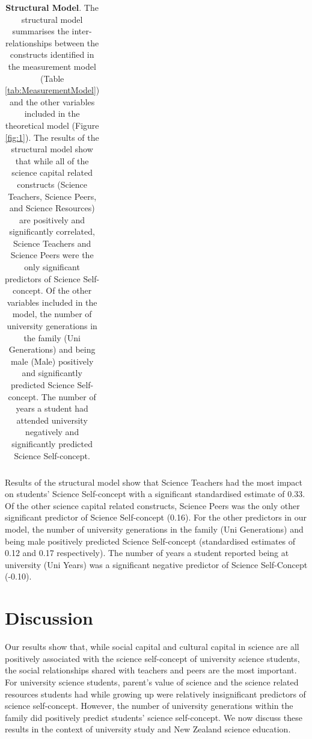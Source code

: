 \begin{landscape}
\begin{table}[ht]
\begin{tabular}{llrrrrr}
   \hline
\end{tabular}
\caption{\textbf{Structural Model}. The structural model summarises the inter-relationships between the constructs identified in the measurement model (Table \ref{tab:MeasurementModel}) and the other variables included in the theoretical model (Figure  \ref{fig:1}). The results of the structural model show that while all of the science capital related constructs (Science Teachers, Science Peers, and Science Resources) are positively and significantly correlated, Science Teachers and Science Peers were the only significant predictors of Science Self-concept. Of the other variables included in the model, the number of university generations in the family (Uni Generations) and being male (Male) positively and significantly predicted Science Self-concept. The number of years a student had attended university negatively and significantly predicted Science Self-concept.} 
\label{tab:StructuralModel}
\end{table}
\end{landscape}

Results of the structural model show that Science Teachers had the most impact on students' Science Self-concept with a significant standardised estimate of 0.33. Of the other science capital related constructs, Science Peers was the only other significant predictor of Science Self-concept (0.16). For the other predictors in our model, the number of university generations in the family (Uni Generations) and being male positively predicted Science Self-concept (standardised estimates of 0.12 and 0.17 respectively). The number of years a student reported being at university (Uni Years) was a significant negative predictor of Science Self-Concept (-0.10). 

\section*{Discussion}
\label{discussion}
Our results show that, while social capital and cultural capital in science are all positively associated with the science self-concept of university science students, the social relationships shared with teachers and peers are the most important. For university science students, parent's value of science and the science related resources students had while growing up were relatively insignificant predictors of science self-concept. However, the number of university generations within the family did positively predict students' science self-concept. We now discuss these results in the context of university study and New Zealand science education.

